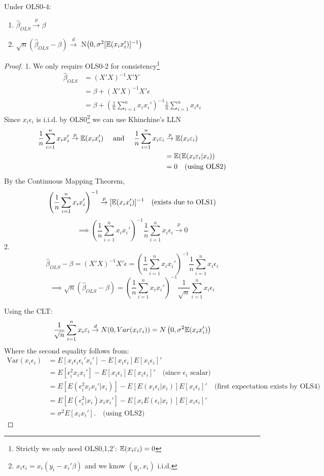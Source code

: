 \documentclass[DIV=14,titlepage=false]{scrreprt}
\begin{document}
\begin{theorem}
    Under OLS0-4:
    \begin{enumerate}
        \item $\hat\beta_{OLS} \overset{p}{\to} \beta$
        \item $\sqrt{n}(\hat\beta_{OLS}-\beta) \overset{d}{\to}$ N$\left(0,\sigma^2[\mathbb{E}(x_ix_i')]^{-1}\right)$
    \end{enumerate}
\end{theorem}
\begin{proof}
1. We only require OLS0-2 for consistency\footnote[1]{Strictly we only need OLS0,1,2': $\mathbb{E}(x_i \varepsilon_i) =0$ }
\begin{align*}
    \hat\beta_{OLS} &= (X'X)^{-1}X'Y\\
    &= \beta + (X'X)^{-1}X'\epsilon\\
    &= \beta + \left(\frac{1}{n}\sum_{i=1}^{n} x_i x_i'\right)^{-1} \frac{1}{n}\sum_{i=1}^{n} x_i \epsilon_i
\end{align*}
Since $x_i \epsilon_i$ is i.i.d. by OLS0\footnote[2]{$x_i\epsilon_i = x_i(y_i-x_i'\beta)$ and we know $(y_i, x_i)$ i.i.d.} we can use Khinchine's LLN
\begin{align*}
     \frac{1}{n}\sum_{i=1}^{n} x_i x_i' \overset{p}{\to} \mathbb{E}(x_ix_i') \quad \text{ and } \quad \frac{1}{n}\sum_{i=1}^{n} x_i \varepsilon_i &\overset{p}{\to} \mathbb{E}(x_i \varepsilon_i) \\
     &=\mathbb{E}(\mathbb{E}(x_i \varepsilon_i|x_i))\\
     &= 0 \quad \text{(using OLS2)}
\end{align*}
By the Continuous Mapping Theorem,
\[ \left(\frac{1}{n}\sum_{i=1}^{n} x_i x_i'\right)^{-1} \overset{p}{\to} [\mathbb{E}(x_ix_i')]^{-1} \quad \text{(exists due to OLS1)} \]
\[ \implies \left(\frac{1}{n}\sum_{i=1}^{n} x_i x_i'\right)^{-1} \frac{1}{n}\sum_{i=1}^{n} x_i \epsilon_i \overset{p}{\to} 0\]
2.
\[ \hat\beta_{OLS} - \beta = (X'X)^{-1}X'\epsilon = \left(\frac{1}{n}\sum_{i=1}^{n} x_i x_i'\right)^{-1} \frac{1}{n}\sum_{i=1}^{n} x_i \epsilon_i \]
\[ \implies \sqrt{n}\left(\hat\beta_{OLS} - \beta\right) = \left(\frac{1}{n}\sum_{i=1}^{n} x_i x_i'\right)^{-1} \frac{1}{\sqrt{n}}\sum_{i=1}^{n} x_i \epsilon_i \]

Using the CLT: 
\[ \frac{1}{\sqrt{n}}\sum_{i=1}^{n} x_i \varepsilon_i \overset{d}{\to} N(0,Var(x_i\varepsilon_i)) = N\left(0,\sigma^2\mathbb{E}(x_ix_i')\right)\]
Where the second equality follows from: 
\begin{align*}
    \text{Var}(x_i\epsilon_i) &= E[x_i\epsilon_i\epsilon_i'x_i'] - E[x_i\epsilon_i]E[x_i\epsilon_i]' \\
    &= E[\epsilon_i^2 x_i x_i'] - E[x_i\epsilon_i]E[x_i\epsilon_i]' \quad \text{(since $\epsilon_i$ scalar) }\\
    &= E[E(\epsilon_i^2 x_i x_i'|x_i)] - E[E(x_i\epsilon_i|x_i)]E[x_i\epsilon_i]' \quad \text{(first expectation exists by OLS4)} \\
    &= E[E(\epsilon_i^2 |x_i) x_i x_i'] - E[x_iE(\epsilon_i|x_i)]E[x_i\epsilon_i]' \\
    &= \sigma^2 E[x_i x_i']. \quad \text{(using OLS2) }
\end{align*}


\end{proof}
\end{document}
